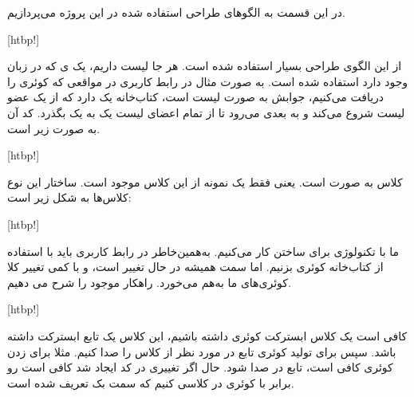 

در این قسمت به الگوهای طراحی  استفاده شده در این پروژه می‌پردازیم.


	 
	
	[htbp!]
	
	از این الگوی طراحی بسیار استفاده شده است. هر جا لیست داریم، یک  ی  که در زبان وجود دارد استفاده شده است. به صورت مثال در رابط کاربری در مواقعی که کوئری‌ را دریافت می‌کنیم، جوابش به صورت لیست است، کتاب‌خانه  یک  دارد که از یک عضو لیست شروع می‌کند و به بعدی می‌رود تا از تمام اعضای لیست یک به یک بگذرد. کد آن به صورت زیر است.
	
	
	[htbp!]
	
	\newpage
	
	 
	
کلاس  به صورت  است. یعنی فقط یک نمونه از این کلاس موجود است. ساختار این نوع کلاس‌ها به شکل زیر است:


	[htbp!]
	
	\newpage
	 
	
	ما با تکنولوژی  برای ساختن  کار می‌کنیم. به‌همین‌خاطر در رابط کاربری باید با استفاده از کتاب‌خانه  کوئری بزنیم. اما سمت  همیشه در حال تغییر است، و با کمی تغییر کلا کوئری‌های ما به‌هم می‌خورد. راهکار موجود را شرح می دهیم.
	
		[htbp!]
		
		کافی است یک کلاس ابسترکت کوئری داشته باشیم، این کلاس یک تابع ابسترکت  داشته باشد. سپس برای تولید کوئری تابع  در  مورد نظر از کلاس را صدا کنیم. مثلا برای زدن کوئری  کافی است، تابع  در  صدا شود. حال اگر تغییری در کد ایجاد شد کافی است  رو برابر با کوئری در کلاسی کنیم که سمت بک تعریف شده است.

